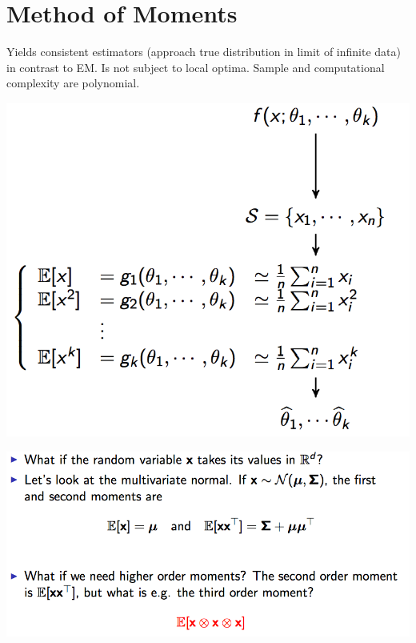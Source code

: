 \section{Method of Moments}

Yields consistent estimators (approach true distribution in limit of infinite data) in contrast to EM. Is not subject to local optima. Sample and computational complexity are polynomial.

\includegraphics[width=\linewidth]{method_of_moments.png}

\includegraphics[width=\linewidth]{mom_tensors.png}

